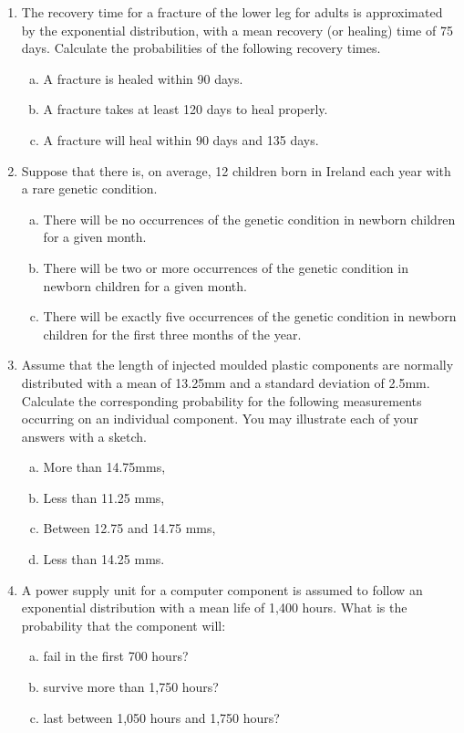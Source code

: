 \documentclass[a4paper,12pt]{article}
\begin{document}
\begin{enumerate}
\item 
The recovery time for a fracture of the lower leg for adults 
is approximated by the exponential distribution, with a mean recovery (or healing) time of 75 days.
Calculate the probabilities of the following recovery times.
\begin{enumerate}[(a)]
\item A fracture is healed within 90 days.
\item A fracture takes at least 120 days to heal properly.
\item A fracture will heal within 90 days and 135 days.
\end{enumerate}
\item Suppose that there is, on average, 12 children born in Ireland each year with a rare genetic condition.

\begin{enumerate}[(a)]

\item There will be no occurrences of the genetic condition in newborn children for a given month.
\item There will be two or more occurrences of the genetic condition in newborn children for a given month.
\item There will be exactly five occurrences of the genetic condition in newborn children for the first three months of the year.
\end{enumerate}
\item 
Assume that the length of injected moulded plastic components are normally distributed with a mean of 13.25mm and a standard deviation of 2.5mm.  Calculate the corresponding probability for the following measurements occurring on an individual component. You may illustrate each of your answers with a sketch.

\begin{enumerate}[(a)]
\item More than 14.75mms,
\item Less than 11.25 mms,
\item Between 12.75 and 14.75 mms,
\item Less than 14.25 mms.
\end{enumerate}
\item A power supply unit for a computer component is assumed to follow an exponential distribution with a mean life of 1,400 hours.  What is the probability that the component will: 
\begin{enumerate}[(a)]
\item fail in the first 700 hours? 
\item survive more than 1,750 hours? 
\item last between 1,050 hours and 1,750 hours? 
\end{enumerate} 


\end{enumerate}
\end{document}
